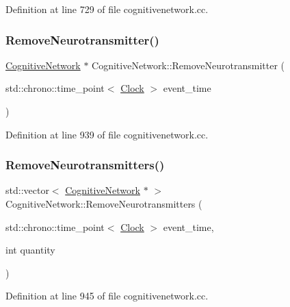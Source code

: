 Definition at line 729 of file cognitivenetwork.\+cc.

\mbox{\label{class_cognitive_network_ac0728c12a6d4bb87b6e8c9163435c8e6}} 
\subsubsection{\texorpdfstring{Remove\+Neurotransmitter()}{RemoveNeurotransmitter()}}
{\footnotesize\ttfamily \mbox{\hyperlink{class_cognitive_network}{Cognitive\+Network}} $\ast$ Cognitive\+Network\+::\+Remove\+Neurotransmitter (\begin{DoxyParamCaption}\item[{std\+::chrono\+::time\+\_\+point$<$ \mbox{\hyperlink{universe_8h_a0ef8d951d1ca5ab3cfaf7ab4c7a6fd80}{Clock}} $>$}]{event\+\_\+time }\end{DoxyParamCaption})}



Definition at line 939 of file cognitivenetwork.\+cc.

\mbox{\label{class_cognitive_network_a5e706084296ce84ff6884c1506213b03}} 
\subsubsection{\texorpdfstring{Remove\+Neurotransmitters()}{RemoveNeurotransmitters()}}
{\footnotesize\ttfamily std\+::vector$<$ \mbox{\hyperlink{class_cognitive_network}{Cognitive\+Network}} $\ast$ $>$ Cognitive\+Network\+::\+Remove\+Neurotransmitters (\begin{DoxyParamCaption}\item[{std\+::chrono\+::time\+\_\+point$<$ \mbox{\hyperlink{universe_8h_a0ef8d951d1ca5ab3cfaf7ab4c7a6fd80}{Clock}} $>$}]{event\+\_\+time,  }\item[{int}]{quantity }\end{DoxyParamCaption})}



Definition at line 945 of file cognitivenetwork.\+cc.

